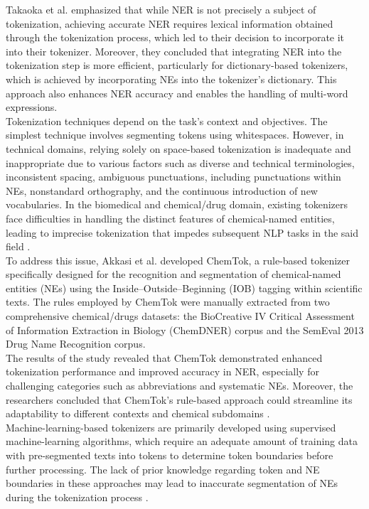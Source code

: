 \documentclass[journal]{./IEEE/IEEEtran}
\begin{document}
\newpage

Takaoka et al. {\cite{Sudachi}} emphasized that while NER is not precisely a subject of tokenization, achieving accurate NER requires lexical information obtained through the tokenization process, which led to their decision to incorporate it into their tokenizer. Moreover, they concluded that integrating NER into the tokenization step is more efficient, particularly for dictionary-based tokenizers, which is achieved by incorporating NEs into the tokenizer's dictionary. This approach also enhances NER accuracy and enables the handling of multi-word expressions. \\

Tokenization techniques depend on the task's context and objectives. The simplest technique involves segmenting tokens using whitespaces. However, in technical domains, relying solely on space-based tokenization is inadequate and inappropriate due to various factors such as diverse and technical terminologies, inconsistent spacing, ambiguous punctuations, including punctuations within NEs, nonstandard orthography, and the continuous introduction of new vocabularies. In the biomedical and chemical/drug domain, existing tokenizers face difficulties in handling the distinct features of chemical-named entities, leading to imprecise tokenization that impedes subsequent NLP tasks in the said field {\cite{ChemTok}}. \\

To address this issue, Akkasi et al. {\cite{ChemTok}} developed ChemTok, a rule-based tokenizer specifically designed for the recognition and segmentation of chemical-named entities (NEs) using the Inside–Outside–Beginning (IOB) tagging within scientific texts. The rules employed by ChemTok were manually extracted from two comprehensive chemical/drugs datasets:  the BioCreative IV Critical Assessment of Information Extraction in Biology (ChemDNER) corpus and the SemEval 2013 Drug Name Recognition corpus. \\

The results of the study revealed that ChemTok demonstrated enhanced tokenization performance and improved accuracy in NER, especially for challenging categories such as abbreviations and systematic NEs. Moreover, the researchers concluded that ChemTok's rule-based approach could streamline its adaptability to different contexts and chemical subdomains {\cite{ChemTok}}. \\

Machine-learning-based tokenizers are primarily developed using supervised machine-learning algorithms, which require an adequate amount of training data with pre-segmented texts into tokens to determine token boundaries before further processing. The lack of prior knowledge regarding token and NE boundaries in these approaches may lead to inaccurate segmentation of NEs during the tokenization process {\cite{ChemTok}}. 
\end{document}
